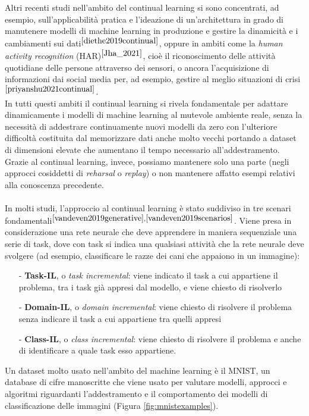 Altri recenti studi nell'ambito del continual learning si sono concentrati, ad esempio, sull'applicabilità pratica e l'ideazione di un'architettura in grado di manutenere modelli di machine learning in produzione e gestire la dinamicità e i cambiamenti sui dati$^{\cite{diethe2019continual}}$, oppure in ambiti come la \textit{human activity recognition} (HAR)$^{\cite{Jha_2021}}$, cioè il riconoscimento delle attività quotidiane delle persone attraverso dei sensori, o ancora l'acquisizione di informazioni dai social media per, ad esempio, gestire al meglio situazioni di crisi$^{\cite{priyanshu2021continual}}$.\\
In tutti questi ambiti il continual learning si rivela fondamentale per adattare dinamicamente i modelli di machine learning al mutevole ambiente reale, senza la necessità di addestrare continuamente nuovi modelli da zero con l'ulteriore difficoltà costituita dal memorizzare dati anche molto vecchi portando a dataset di dimensioni elevate che aumentano il tempo necessario all'addestramento. Grazie al continual learning, invece, possiamo mantenere solo una parte (negli approcci cosiddetti di \textit{reharsal} o \textit{replay}) o non mantenere affatto esempi relativi alla conoscenza precedente.\\\\
In molti studi, l'approccio al continual learning è stato suddiviso in tre scenari fondamentali$^{\cite{vandeven2019generative},\cite{vandeven2019scenarios}}$. Viene presa in considerazione una rete neurale che deve apprendere in maniera sequenziale una serie di task, dove con task si indica una qualsiasi attività che la rete neurale deve svolgere (ad esempio, classificare le razze dei cani che appaiono in un immagine):
\begin{itemize}
    \item[-] \textbf{Task-IL}, o \textit{task incremental}: viene indicato il task a cui appartiene il problema, tra i task già appresi dal modello, e viene chiesto di risolverlo
    \item[-] \textbf{Domain-IL}, o \textit{domain incremental}: viene chiesto di risolvere il problema senza indicare il task a cui appartiene tra quelli appresi
    \item[-] \textbf{Class-IL}, o \textit{class incremental}: viene chiesto di risolvere il problema e anche di identificare a quale task esso appartiene.
\end{itemize}
Un dataset molto usato nell'ambito del machine learning è il MNIST, un database di cifre manoscritte che viene usato per valutare modelli, approcci e algoritmi riguardanti l'addestramento e il comportamento dei modelli di classificazione delle immagini (Figura \ref{fig:mnistexamples}).
